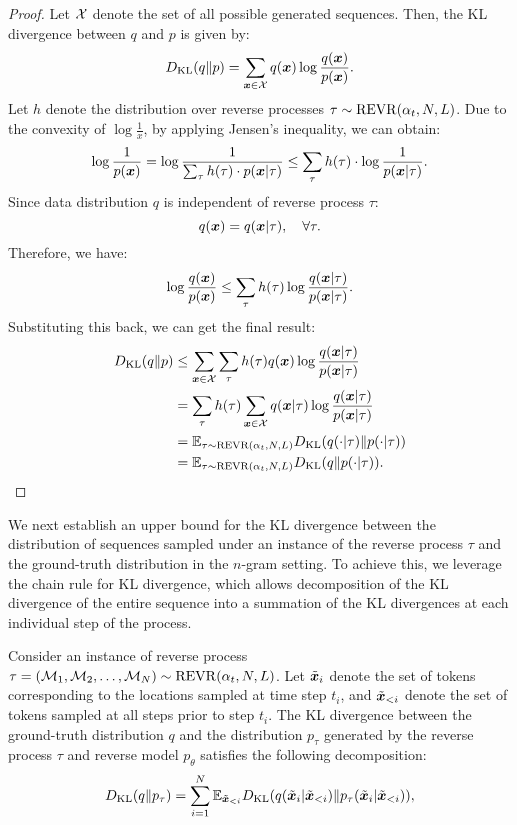 \begin{proof}
Let ${\mathcal{X}}$ denote the set of all possible generated sequences. Then, the KL divergence between $q$ and $p$ is given by:
$$D_{\mathrm{KL}}(q\|p)=\sum_{{\bm{x}}\in{\mathcal{X}}}q({\bm{x}})\log \frac{q({\bm{x}})}{p({\bm{x}})}.$$
Let $h$ denote the distribution over reverse processes $\tau \sim \operatorname{REVR}(\alpha_t, N, L)$. Due to the convexity of $\log\frac{1}{x}$, by applying Jensen's inequality, we can obtain:
$$\log\frac{1}{p({\bm{x}})}=\log\frac{1}{\sum_{\tau}h(\tau)\cdot p({\bm{x}}|\tau)}\leq\sum_\tau h(\tau)\cdot\log\frac{1}{p({\bm{x}}|\tau)}.$$
Since data distribution $q$ is independent of reverse process $\tau$:
$$q({\bm{x}})=q({\bm{x}}|\tau), \quad \forall\tau.$$
Therefore, we have:
$$\log\frac{q({\bm{x}})}{p({\bm{x}})}\leq\sum_\tau h(\tau)\log\frac{q({\bm{x}}|\tau)}{p({\bm{x}}|\tau)}.$$
Substituting this back, we can get the final result:
\begin{align*}
    D_{\mathrm{KL}}(q\|p)&\leq\sum_{{\bm{x}}\in{\mathcal{X}}}\sum_\tau h(\tau)q({\bm{x}})\log\frac{q({\bm{x}}|\tau)}{p({\bm{x}}|\tau)}\\
    &=\sum_\tau h(\tau)\sum_{{\bm{x}}\in{\mathcal{X}}} q({\bm{x}}|\tau)\log\frac{q({\bm{x}}|\tau)}{p({\bm{x}}|\tau)}\\
    &=\mathbb{E}_{\tau \sim \operatorname{REVR}(\alpha_t, N, L)} D_{\mathrm{KL}}(q(\cdot | \tau)\|p(\cdot | \tau))\\
    &=\mathbb{E}_{\tau \sim \operatorname{REVR}(\alpha_t, N, L)} D_{\mathrm{KL}}(q\|p(\cdot | \tau)).
\end{align*}
\end{proof}

We next establish an upper bound for the KL divergence between the distribution of sequences sampled under an instance of the reverse process $\tau$ and the ground-truth distribution in the $n$-gram setting. To achieve this, we leverage the chain rule for KL divergence, which allows decomposition of the KL divergence of the entire sequence into a summation of the KL divergences at each individual step of the process.

\begin{lemma}
\label{lemma:kl_decomp_rev}
    Consider an instance of reverse process $\tau = ({\mathcal{M}}_1, {\mathcal{M}}_2, \dots, {\mathcal{M}}_N)\sim \operatorname{REVR}(\alpha_t, N, L)$. Let $\Tilde{{\bm{x}}}_i$ denote the set of tokens corresponding to the locations sampled at time step $t_i$, and $\Tilde{{\bm{x}}}_{<i}$ denote the set of tokens sampled at all steps prior to step $t_i$. The KL divergence between the ground-truth distribution $q$ and the distribution $p_\tau$ generated by the reverse process $\tau$ and reverse model $p_\theta$ satisfies the following decomposition:
    \begin{equation*}
        D_{\mathrm{KL}}(q\|p_\tau) = \sum_{i=1}^N \mathbb{E}_{\Tilde{{\bm{x}}}_{<i}}D_{\mathrm{KL}}(q(\Tilde{{\bm{x}}}_i | \Tilde{{\bm{x}}}_{<i})\|p_\tau(\Tilde{{\bm{x}}}_i | \Tilde{{\bm{x}}}_{<i})),
    \end{equation*}
\end{lemma}

